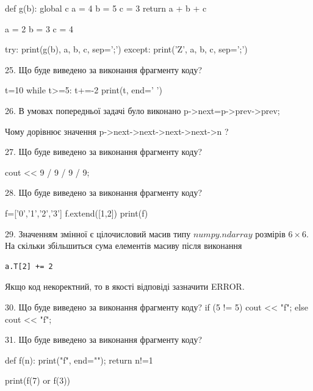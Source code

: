 \documentclass[11pt]{article}
\begin{document}
def g(b):
global c    a = 4
    b = 5
    c = 3
    return a + b + c

a = 2
b = 3
c = 4

try:
    print(g(b), a, b, c, sep=';')
except:
    print('Z', a, b, c, sep=';')
\vspace{5mm}

25. Що буде виведено за виконання фрагменту коду?

t=10
while t>=5:
    t+=-2
print(t, end=' ')

\vspace{5mm}

26. 
В умовах попередньої задачі було виконано p->next=p->prev->prev;

Чому дорівнює значення p->next->next->next->next->n ?\vspace{5mm}

27. Що буде виведено за виконання фрагменту коду?

cout << 9 / 9 / 9 / 9;
\vspace{5mm}

28. Що буде виведено за виконання фрагменту коду?

f=['0','1','2','3']
f.extend([1,2])
print(f)

\vspace{5mm}

29. 
Значенням змінної  є цілочисловий масив типу $numpy.ndarray$ розмірів $6{\times}6$. На скільки збільшиться сума елементів масиву  після виконання
\begin{verbatim}
a.T[2] += 2
\end{verbatim}


Якщо код некоректний, то в якості відповіді зазначити ERROR.


\vspace{5mm}

30. Що буде виведено за виконання фрагменту коду?
if (5 != 5)
    cout << "f";
else
    cout << "f";

\vspace{5mm}

31. Що буде виведено за виконання фрагменту коду?

def f(n):
    print("f", end="");
    return n!=1

print(f(7) or f(3))
\vspace{5mm}
\end{document}
